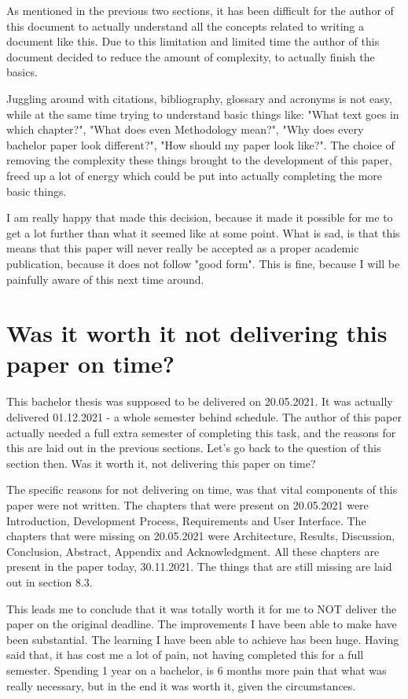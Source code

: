 As mentioned in the previous two sections, it has been difficult for the author of this document to actually understand all the concepts related to writing a document like this. Due to this limitation and limited time the author of this document decided to reduce the amount of complexity, to actually finish the basics.

Juggling around with citations, bibliography, glossary and acronyms is not easy, while at the same time trying to understand basic things like: "What text goes in which chapter?", "What does even Methodology mean?", "Why does every bachelor paper look different?", "How should my paper look like?". The choice of removing the complexity these things brought to the development of this paper, freed up a lot of energy which could be put into actually completing the more basic things.

I am really happy that made this decision, because it made it possible for me to get a lot further than what it seemed like at some point. What is sad, is that this means that this paper will never really be accepted as a proper academic publication, because it does not follow "good form". This is fine, because I will be painfully aware of this next time around.



\section{Was it worth it not delivering this paper on time?}

This bachelor thesis was supposed to be delivered on 20.05.2021. It was actually delivered 01.12.2021 - a whole semester behind schedule. The author of this paper actually needed a full extra semester of completing this task, and the reasons for this are laid out in the previous sections. Let's go back to the question of this section then. Was it worth it, not delivering this paper on time?

The specific reasons for not delivering on time, was that vital components of this paper were not written. The chapters that were present on 20.05.2021 were Introduction, Development Process, Requirements and User Interface. The chapters that were missing on 20.05.2021 were Architecture, Results, Discussion, Conclusion, Abstract, Appendix and Acknowledgment. All these chapters are present in the paper today, 30.11.2021. The things that are still missing are laid out in section 8.3.

This leads me to conclude that it was totally worth it for me to NOT deliver the paper on the original deadline. The improvements I have been able to make have been substantial. The learning I have been able to achieve has been huge. Having said that, it has cost me a lot of pain, not having completed this for a full semester. Spending 1 year on a bachelor, is 6 months more pain that what was really necessary, but in the end it was worth it, given the circumstances.




